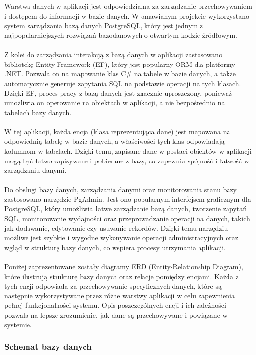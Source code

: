 \documentclass[twoside]{projektInzynierskiMS1}
\begin{document}
\noindent
Warstwa danych w aplikacji jest odpowiedzialna za zarządzanie przechowywaniem i dostępem do informacji w bazie danych. W omawianym projekcie wykorzystano system zarządzania bazą danych PostgreSQL, który jest jednym z najpopularniejszych rozwiązań bazodanowych o otwartym kodzie źródłowym.
\\\\
Z kolei do zarządzania interakcją z bazą danych w aplikacji zastosowano bibliotekę Entity Framework (EF), który jest popularny ORM dla platformy .NET. Pozwala on na mapowanie klas C\# na tabele w bazie danych, a także automatycznie generuje zapytania SQL na podstawie operacji na tych klasach. Dzięki EF, proces pracy z bazą danych jest znacznie uproszczony, ponieważ umożliwia on operowanie na obiektach w aplikacji, a nie bezpośrednio na tabelach bazy danych.
\\\\
W tej aplikacji, każda encja (klasa reprezentująca dane) jest mapowana na odpowiednią tabelę w bazie danych, a właściwości tych klas odpowiadają kolumnom w tabelach. Dzięki temu, zapisane dane w postaci obiektów w aplikacji mogą być łatwo zapisywane i pobierane z bazy, co zapewnia spójność i łatwość w zarządzaniu danymi.
\\\\
Do obsługi bazy danych, zarządzania danymi oraz monitorowania stanu bazy zastosowano narzędzie PgAdmin. Jest ono popularnym interfejsem graficznym dla PostgreSQL, który umożliwia łatwe zarządzanie bazą danych, tworzenie zapytań SQL, monitorowanie wydajności oraz przeprowadzanie operacji na danych, takich jak dodawanie, edytowanie czy usuwanie rekordów. Dzięki temu narzędziu możliwe jest szybkie i wygodne wykonywanie operacji administracyjnych oraz wgląd w strukturę bazy danych, co wspiera procesy utrzymania aplikacji.
\\\\
Poniżej zaprezentowane zostały diagramy ERD (Entity-Relationship Diagram), które ilustrują strukturę bazy danych oraz relacje pomiędzy encjami. Każda z tych encji odpowiada za przechowywanie specyficznych danych, które są następnie wykorzystywane przez różne warstwy aplikacji w celu zapewnienia pełnej funkcjonalności systemu. Opis poszczególnych encji i ich zależności pozwala na lepsze zrozumienie, jak dane są przechowywane i powiązane w systemie.

\newpage

\subsubsection{Schemat bazy danych}
\end{document}
